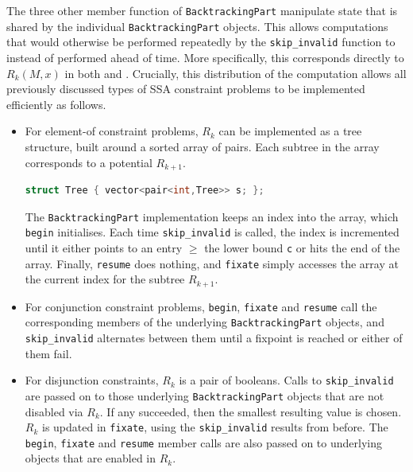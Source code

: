     The three other member function of \texttt{BacktrackingPart} manipulate
    state that is shared by the individual \texttt{BacktrackingPart} objects.
    This allows computations that would otherwise be performed repeatedly by
    the \texttt{skip\_invalid} function to instead of performed ahead of time.
    More specifically, this corresponds directly to $R_k(M,x)$ in both
     and .
    Crucially, this distribution of the computation allows all previously
    discussed types of SSA constraint problems to be implemented efficiently as
    follows.
    \begin{itemize}
    \item For element-of constraint problems, $R_k$ can be implemented as a
          tree structure, built around a sorted array of pairs.
          Each subtree in the array corresponds to a potential $R_{k+1}$.
          \begin{lstlisting}[language=C++]
struct Tree { vector<pair<int,Tree>> s; };
          \end{lstlisting}
          The \texttt{BacktrackingPart} implementation keeps an index into
          the array, which \texttt{begin} initialises.
          Each time \texttt{skip\_invalid} is called, the index is incremented
          until it either points to an entry $\geq$ the lower bound \texttt{c}
          or hits the end of the array.
          Finally, \texttt{resume} does nothing, and \texttt{fixate} simply
          accesses the array at the current index for the subtree $R_{k+1}$.
    \item For conjunction constraint problems, \texttt{begin}, \texttt{fixate}
          and \texttt{resume} call the corresponding members of the underlying
          \texttt{BacktrackingPart} objects, and \texttt{skip\_invalid}
          alternates between them until a fixpoint is reached or
          either of them fail.
    \item For disjunction constraints, $R_k$ is a pair of booleans.
          Calls to \texttt{skip\_invalid} are passed on to those underlying
          \texttt{BacktrackingPart} objects that are not disabled via $R_k$.
          If any succeeded, then the smallest resulting value is chosen.
          $R_k$ is updated in \texttt{fixate}, using the \texttt{skip\_invalid}
          results from before.
          The \texttt{begin}, \texttt{fixate} and \texttt{resume} member
          calls are also passed on to underlying objects
          that are enabled in $R_k$.
    \end{itemize}

